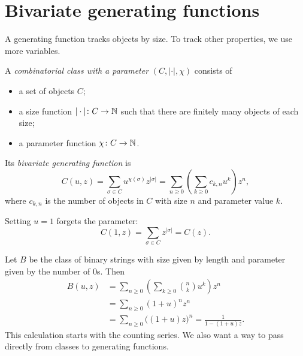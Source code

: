 \section{Bivariate generating functions}
A generating function tracks objects by size. To track other properties, we use more variables.
\begin{definition}
A \textit{combinatorial class with a parameter} $(C,|\cdot|,\chi)$ consists of
\begin{itemize}
\item a set of objects $C$;
\item a size function $|\cdot|\colon C\to\mathbb{N}$ such that there are finitely many objects of each size;
\item a parameter function $\chi\colon C\to\mathbb{N}$.
\end{itemize}
Its \textit{bivariate generating function} is
\[
C(u,z)=\sum_{\sigma\in C}u^{\chi(\sigma)}z^{|\sigma|}
=\sum_{n\ge0}\left(\sum_{k\ge0}c_{k,n}u^k\right)z^n,
\]
where $c_{k,n}$ is the number of objects in $C$ with size $n$ and parameter value $k$.
\end{definition}
Setting $u=1$ forgets the parameter:
\[
C(1,z)=\sum_{\sigma\in C}z^{|\sigma|}=C(z).
\]
\begin{example}
Let $B$ be the class of binary strings with size given by length and parameter given by the number of $0$s. Then
\begin{align*}
B(u,z)&=\sum_{n\ge0}\left(\sum_{k\ge0}\binom nk u^k\right)z^n\\
&=\sum_{n\ge0}(1+u)^nz^n\\
&=\sum_{n\ge0}\bigl((1+u)z\bigr)^n
=\frac1{1-(1+u)z}.
\end{align*}
This calculation starts with the counting series. We also want a way to pass directly from classes to generating functions.
\end{example}

